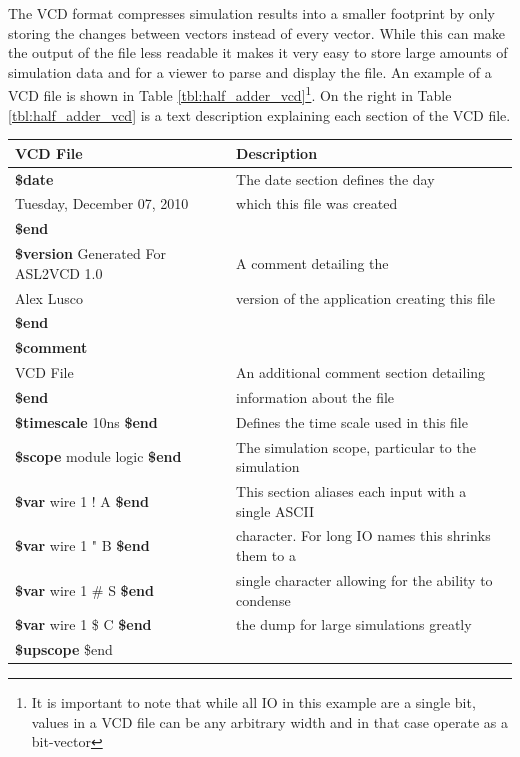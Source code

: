 \documentclass[12pt]{report}
\begin{document}
The VCD format compresses simulation results into a smaller footprint by only storing the changes between vectors instead of every vector\cite{verilog}.  While this can make the output of the file less readable it makes it very easy to store large amounts of simulation data and for a viewer to parse and display the file.  An example of a VCD file is shown in Table \ref{tbl:half_adder_vcd}\footnote{It is important to note that while all IO in this example are a single bit, values in a VCD file can be any arbitrary width and in that case operate as a bit-vector}.  On the right in Table \ref{tbl:half_adder_vcd} is a text description explaining each section of the VCD file.
\begin{table}
	\begin{center}
		\begin{tabular}{l|l}
			VCD File & Description \\ \hline
			\textbf{\$date} & The date section defines the day\\
			Tuesday, December 07, 2010 & which this file was created \\
			\textbf{\$end} & \\
			\textbf{\$version}
			Generated For ASL2VCD 1.0 & A comment detailing the  \\
			Alex Lusco & version of the application creating this file \\
			\textbf{\$end}	\\
			\textbf{\$comment}	\\
			VCD File & An additional comment section detailing \\
			\textbf{\$end} & information about the file \\
			\textbf{\$timescale} 10ns \textbf{\$end} & Defines the time scale used in this file \\
			\textbf{\$scope} module logic \textbf{\$end} & The simulation scope, particular to the simulation \\
			\textbf{\$var} wire 1 ! A \textbf{\$end} & This section aliases each input with a single ASCII \\
			\textbf{\$var} wire 1 " B \textbf{\$end} & character. For long IO names this shrinks them to a  \\
			\textbf{\$var} wire 1 \# S \textbf{\$end} & single character allowing for the ability to condense \\
			\textbf{\$var} wire 1 \$ C \textbf{\$end} & the dump for large simulations greatly \\
			\textbf{\$upscope} \$end & \\

\end{tabular}
\end{center}
\end{table}
\end{document}
